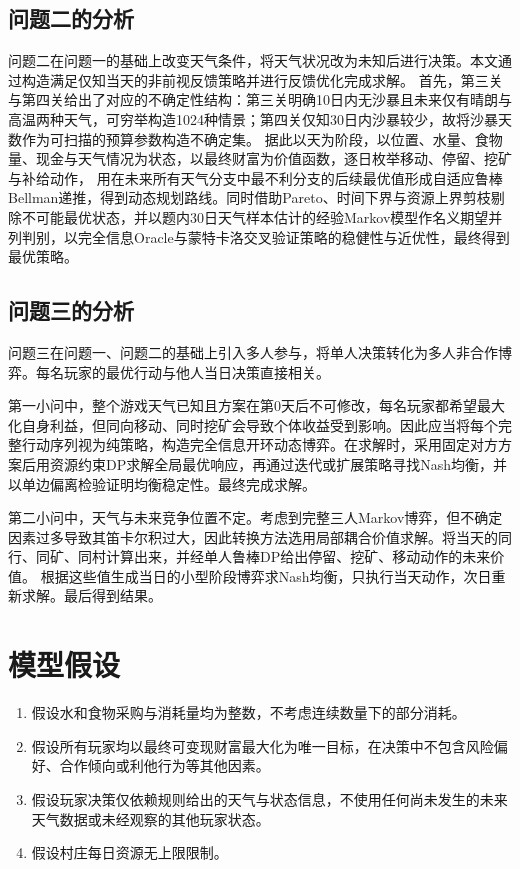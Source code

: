 \documentclass{cumcmthesis}
\numberwithin{equation}{section}
\numberwithin{figure}{section}
\numberwithin{table}{section}
\begin{document}
        \subsection{问题二的分析}
        问题二在问题一的基础上改变天气条件，将天气状况改为未知后进行决策。本文通过构造满足仅知当天的非前视反馈策略并进行反馈优化完成求解。
        首先，第三关与第四关给出了对应的不确定性结构：第三关明确10日内无沙暴且未来仅有晴朗与高温两种天气，可穷举构造1024种情景；第四关仅知30日内沙暴较少，故将沙暴天数作为可扫描的预算参数构造不确定集。
        据此以天为阶段，以位置、水量、食物量、现金与天气情况为状态，以最终财富为价值函数，逐日枚举移动、停留、挖矿与补给动作，
        用在未来所有天气分支中最不利分支的后续最优值形成自适应鲁棒Bellman递推，得到动态规划路线。同时借助Pareto、时间下界与资源上界剪枝剔除不可能最优状态，并以题内30日天气样本估计的经验Markov模型作名义期望并列判别，以完全信息Oracle与蒙特卡洛交叉验证策略的稳健性与近优性，最终得到最优策略。
        \subsection{问题三的分析}
        问题三在问题一、问题二的基础上引入多人参与，将单人决策转化为多人非合作博弈。每名玩家的最优行动与他人当日决策直接相关。

        第一小问中，整个游戏天气已知且方案在第0天后不可修改，每名玩家都希望最大化自身利益，但同向移动、同时挖矿会导致个体收益受到影响。因此应当将每个完整行动序列视为纯策略，构造完全信息开环动态博弈。在求解时，采用固定对方方案后用资源约束DP求解全局最优响应，再通过迭代或扩展策略寻找Nash均衡，并以单边偏离检验证明均衡稳定性。最终完成求解。

        第二小问中，天气与未来竞争位置不定。考虑到完整三人Markov博弈，但不确定因素过多导致其笛卡尔积过大，因此转换方法选用局部耦合价值求解。将当天的同行、同矿、同村计算出来，并经单人鲁棒DP给出停留、挖矿、移动动作的未来价值。
        根据这些值生成当日的小型阶段博弈求Nash均衡，只执行当天动作，次日重新求解。最后得到结果。
\section{模型假设}

\begin{enumerate}
    \item 
    假设水和食物采购与消耗量均为整数，不考虑连续数量下的部分消耗。

    \item 
    假设所有玩家均以最终可变现财富最大化为唯一目标，在决策中不包含风险偏好、合作倾向或利他行为等其他因素。

    \item 
    假设玩家决策仅依赖规则给出的天气与状态信息，不使用任何尚未发生的未来天气数据或未经观察的其他玩家状态。

    \item  
    假设村庄每日资源无上限限制。
\end{enumerate}
\end{document}
